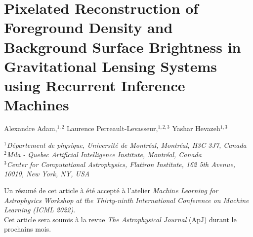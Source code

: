 
%

\chapter{Pixelated Reconstruction of Foreground Density and Background Surface Brightness in Gravitational Lensing Systems using Recurrent Inference Machines}\label{chap:censai}
\thispagestyle{empty}

\begin{center}
Alexandre Adam,$^{1,2}$
Laurence Perreault-Levasseur,$^{1,2,3}$
Yashar Hevazeh$^{1,3}$
\end{center}

\vspace*{0.5cm}
\noindent $^{1}$\textit{D\'{e}partement de physique, Universit\'{e} de Montr\'{e}al, Montr\'{e}al, H3C 3J7, Canada}\\
$^{2}$\textit{Mila - Quebec Artificial Intelligence Institute, Montréal, Canada}\\
$^{3}$\textit{Center for Computational Astrophysics, Flatiron Institute, 162 5th Avenue, 10010, New York, NY, USA}\\
\vspace*{1.5cm}

\begin{center}
Un résumé de cet article à été accepté à l'atelier \textit{Machine Learning for Astrophysics
Workshop at the Thirty-ninth International Conference on Machine Learning (ICML 2022)}. \\
Cet article sera soumis à la revue \textit{The Astrophysical Journal} (ApJ) durant le prochains mois. 
\end{center}


\clearpage
